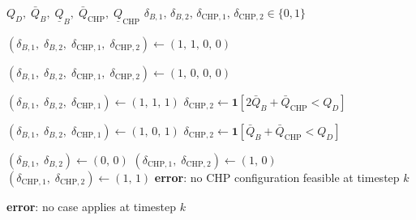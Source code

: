 \begin{algorithm}
\caption{Boiler-on unit-commitment heuristic (evaluated per timestep $k$)}
\label{alg:boiler-on}
\begin{algorithmic}[1]
\Require $Q_D,\;
         \bar{Q}_B,\; \underline{Q}_B,\;
         \bar{Q}_\mathrm{CHP},\; \underline{Q}_\mathrm{CHP}$
\Ensure $\delta_{B,1},\,\delta_{B,2},\,
         \delta_{\mathrm{CHP},1},\,\delta_{\mathrm{CHP},2} \in \{0,1\}$

    \State $(\delta_{B,1},\;\delta_{B,2},\;
            \delta_{\mathrm{CHP},1},\;\delta_{\mathrm{CHP},2}) \gets (1,\,1,\,0,\,0)$

    \State $(\delta_{B,1},\;\delta_{B,2},\;
            \delta_{\mathrm{CHP},1},\;\delta_{\mathrm{CHP},2}) \gets (1,\,0,\,0,\,0)$

    \State $(\delta_{B,1},\;\delta_{B,2},\;
            \delta_{\mathrm{CHP},1}) \gets (1,\,1,\,1)$
    \State $\delta_{\mathrm{CHP},2} \gets
            \mathbf{1}\!\left[2\bar{Q}_B + \bar{Q}_\mathrm{CHP} < Q_D\right]$

    \State $(\delta_{B,1},\;\delta_{B,2},\;
            \delta_{\mathrm{CHP},1}) \gets (1,\,0,\,1)$
    \State $\delta_{\mathrm{CHP},2} \gets
            \mathbf{1}\!\left[\bar{Q}_B + \bar{Q}_\mathrm{CHP} < Q_D\right]$

    \State $(\delta_{B,1},\;\delta_{B,2}) \gets (0,\,0)$
        \State $(\delta_{\mathrm{CHP},1},\;\delta_{\mathrm{CHP},2}) \gets (1,\,0)$
        \State $(\delta_{\mathrm{CHP},1},\;\delta_{\mathrm{CHP},2}) \gets (1,\,1)$
    \Else
        \State \textbf{error}: no CHP configuration feasible at timestep $k$
    \EndIf

\Else
    \State \textbf{error}: no case applies at timestep $k$
\EndIf
\end{algorithmic}
\end{algorithm}
